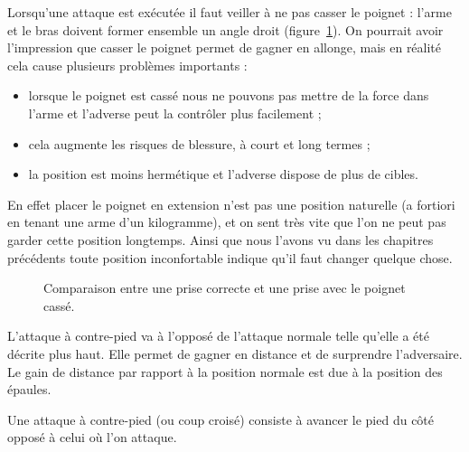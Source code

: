 Lorsqu'une attaque est exécutée il faut veiller à ne pas casser le poignet : l'arme et le bras doivent former ensemble un angle droit (figure~\ref{attdef:fig:poignet-cassé}).
On pourrait avoir l'impression que casser le poignet permet de gagner en allonge, mais en réalité cela cause plusieurs problèmes importants :
\begin{itemize}
	\item lorsque le poignet est cassé nous ne pouvons pas mettre de la force dans l'arme et l'adverse peut la contrôler plus facilement ;
	
	\item cela augmente les risques de blessure, à court et long termes ;
	
	\item la position est moins hermétique et l'adverse dispose de plus de cibles.
\end{itemize}
En effet placer le poignet en extension n'est pas une position naturelle (a fortiori en tenant une arme d'un kilogramme), et on sent très vite que l'on ne peut pas garder cette position longtemps.
Ainsi que nous l'avons vu dans les chapitres précédents toute position inconfortable indique qu'il faut changer quelque chose.


\begin{figure}[ht]
	\centering
	\hspace{3cm}
	\caption{Comparaison entre une prise correcte et une prise avec le poignet cassé.}
	\label{attdef:fig:poignet-cassé}
\end{figure}


L'attaque à contre-pied va à l'opposé de l'attaque normale telle qu'elle a été décrite plus haut.
Elle permet de gagner en distance et de surprendre l'adversaire.
Le gain de distance par rapport à la position normale est due à la position des épaules.

\begin{coup}
\label{struct:coup:contre-pied}

Une attaque à contre-pied (ou coup croisé) consiste à avancer le pied du côté opposé à celui où l'on attaque.
\end{coup}


